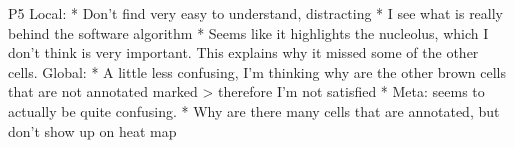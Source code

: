 




P5
Local:
* Don’t find very easy to understand, distracting
* I see what is really behind the software algorithm
* Seems like it highlights the nucleolus, which I don’t think is very important. This explains why it missed some of the other cells.
Global:
* A little less confusing, I’m thinking why are the other brown cells that are not annotated marked > therefore I’m not satisfied
* Meta: seems to actually be quite confusing.
* Why are there many cells that are annotated, but don’t show up on heat map

